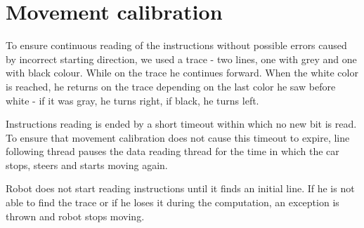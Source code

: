 \section{Movement calibration}
To ensure continuous reading of the instructions without possible errors caused by incorrect starting direction, we used a trace - two lines, one with grey and one with black colour. While on the trace he continues forward. When the white color is reached, he returns on the trace depending on the last color he saw before white - if it was gray, he turns right, if black, he turns left. 

Instructions reading is ended by a short timeout within which no new bit is read. To ensure that movement calibration does not cause this timeout to expire, line following thread pauses the data reading thread for the time in which the car stops, steers and starts moving again.

Robot does not start reading instructions until it finds an initial line. If he is not able to find the trace or if he loses it during the computation, an exception is thrown and robot stops moving.